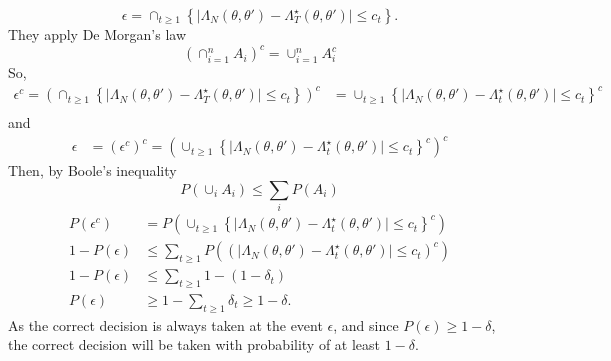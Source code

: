 {\begin{equation}\label{eq:epsilon}
    \mathbb{\epsilon} = \cap_{t\geq 1}\left\{\mid\Lambda_N\left(\theta, \theta'\right) - \Lambda_T^{\star} \left(\theta, \theta'\right) \mid \leq c_t\right\}.   
\end{equation}
They apply De Morgan's law 
\begin{equation}
    \left(\cap_{i=1}^n A_i\right)^c = \cup_{i=1}^n A_i^c
\end{equation}
So, 
\begin{equation}
\begin{split}
     \epsilon^c = \left(\cap _{t\geq 1}\left\{\mid \Lambda_N\left(\theta, \theta'\right) - \Lambda_T^{\star}\left(\theta, \theta'\right) \mid \leq c_t\right\}\right)^c &= \cup_{t\geq 1} \left\{\mid \Lambda_N\left(\theta, \theta'\right) - \Lambda_t^{\star}\left(\theta, \theta'\right) \mid \leq c_t\right\}^c \\
\end{split}
\end{equation}
and 
\begin{equation}
\begin{split}
    \epsilon &= \left(\epsilon^c\right)^c = \left(\cup_{t\geq 1} \left\{\mid \Lambda_N\left(\theta, \theta'\right) - \Lambda_t^{\star}\left(\theta, \theta'\right) \mid \leq c_t \right\}^c\right)^c 
\end{split}
\end{equation}{}
Then, by Boole's inequality
\begin{equation}\label{eq:Boole}
    P\left(\cup_i A_i \right) \leq \sum_{i} P\left(A_i\right)
\end{equation}
\begin{equation}
\begin{split}
       P\left(\epsilon^c\right) &= P\left(\cup_{t\geq 1} \left\{\mid\Lambda_N\left(\theta, \theta'\right)- \Lambda_t^{\star}\left(\theta, \theta'\right) \mid \leq c_t\right\}^c\right) \\
    1 - P\left(\epsilon\right) &\leq \sum_{t\geq 1} P\left(\left(\mid \Lambda_N\left(\theta, \theta'\right) - \Lambda_t^{\star}\left(\theta, \theta'\right) \mid \leq c_t \right)^c\right) \\ 
    1 - P\left(\epsilon\right) &\leq \sum_{t\geq 1} 1 - \left(1 - \delta_t\right) \\
    P\left(\epsilon\right) &\geq 1 - \sum_{t\geq 1} \delta_t \geq 1 - \delta.  
\end{split}
\end{equation}
As the correct decision is always taken at the event $\epsilon$, and since $P\left(\epsilon\right)\geq 1- \delta$, the correct decision will be taken with probability of at least $1 - \delta$. 
}
